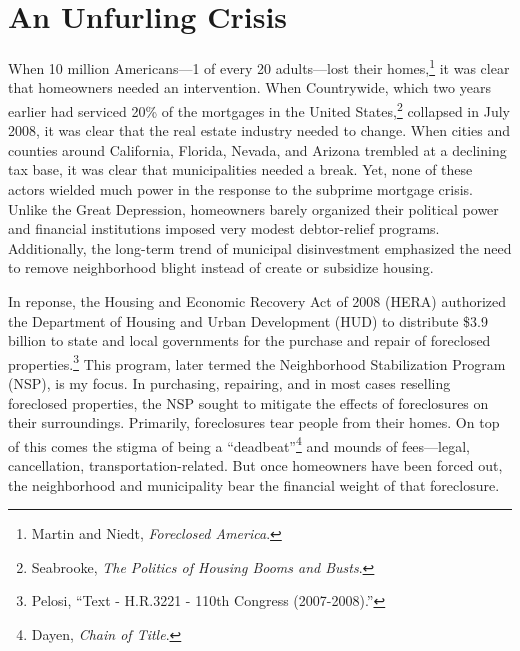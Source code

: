 \documentclass[
]{article}
\date{}
\let\rmarkdownfootnote\footnote%
\def\footnote{\protect\rmarkdownfootnote}
\begin{document}
\hypertarget{actors-motive}{%
\section{An Unfurling Crisis}\label{actors-motive}}

When 10 million Americans---1 of every 20 adults---lost their
homes,\footnote{Martin and Niedt, \emph{Foreclosed America}.} it was
clear that homeowners needed an intervention. When Countrywide, which
two years earlier had serviced 20\% of the mortgages in the United
States,\footnote{Seabrooke, \emph{The Politics of Housing Booms and
  Busts}.} collapsed in July 2008, it was clear that the real estate
industry needed to change. When cities and counties around California,
Florida, Nevada, and Arizona trembled at a declining tax base, it was
clear that municipalities needed a break. Yet, none of these actors
wielded much power in the response to the subprime mortgage crisis.
Unlike the Great Depression, homeowners barely organized their political
power and financial institutions imposed very modest debtor-relief
programs. Additionally, the long-term trend of municipal disinvestment
emphasized the need to remove neighborhood blight instead of create or
subsidize housing.

In reponse, the Housing and Economic Recovery Act of 2008 (HERA)
authorized the Department of Housing and Urban Development (HUD) to
distribute \$3.9 billion to state and local governments for the purchase
and repair of foreclosed properties.\footnote{Pelosi, ``Text - H.R.3221
  - 110th Congress (2007-2008).''} This program, later termed the
Neighborhood Stabilization Program (NSP), is my focus. In purchasing,
repairing, and in most cases reselling foreclosed properties, the NSP
sought to mitigate the effects of foreclosures on their surroundings.
Primarily, foreclosures tear people from their homes. On top of this
comes the stigma of being a ``deadbeat''\footnote{Dayen, \emph{Chain of
  Title}.} and mounds of fees---legal, cancellation,
transportation-related. But once homeowners have been forced out, the
neighborhood and municipality bear the financial weight of that
foreclosure.
\end{document}

